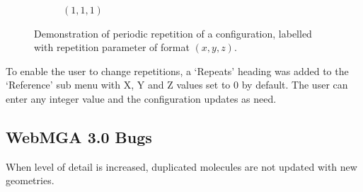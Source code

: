 \begin{figure}
\begin{center}
\begin{subfigure}{0.3\textwidth}
      \caption{$(1,1,1)$}
      \label{fig:periodic_3}
    \end{subfigure}
  \end{center}
  \caption{Demonstration of periodic repetition of a configuration, labelled with repetition parameter of format $(x, y, z)$.}
  \label{fig:periodic}
\end{figure}

To enable the user to change repetitions, a `Repeats' heading was added to the `Reference' sub menu with X, Y and Z values set to 0 by default. The user can enter any integer value and the configuration updates as need.

\subsection{WebMGA 3.0 Bugs}
When level of detail is increased, duplicated molecules are not updated with new geometries.
